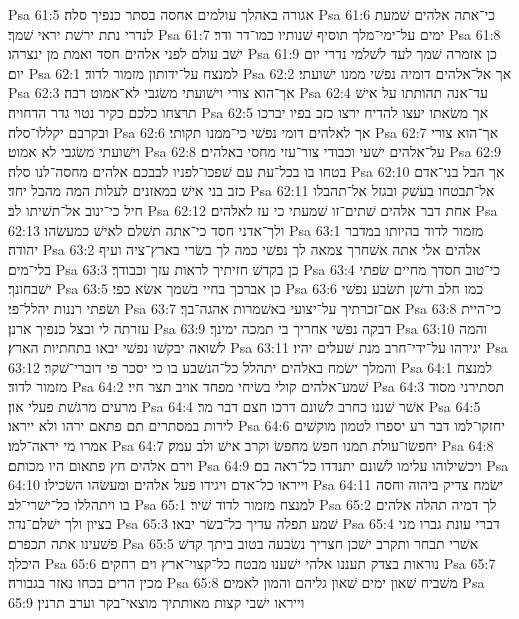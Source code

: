 Psa 61:5  אגורה באהלך עולמים אחסה בסתר כנפיך סלה׃
Psa 61:6  כי־אתה אלהים שׁמעת לנדרי נתת ירשׁת יראי שׁמך׃
Psa 61:7  ימים על־ימי־מלך תוסיף שׁנותיו כמו־דר ודר׃
Psa 61:8  ישׁב עולם לפני אלהים חסד ואמת מן ינצרהו׃
Psa 61:9  כן אזמרה שׁמך לעד לשׁלמי נדרי יום יום׃
Psa 62:1  למנצח על־ידותון מזמור לדוד׃
Psa 62:2  אך אל־אלהים דומיה נפשׁי ממנו ישׁועתי׃
Psa 62:3  אך־הוא צורי וישׁועתי משׂגבי לא־אמוט רבה׃
Psa 62:4  עד־אנה תהותתו על אישׁ תרצחו כלכם כקיר נטוי גדר הדחויה׃
Psa 62:5  אך משׂאתו יעצו להדיח ירצו כזב בפיו יברכו ובקרבם יקללו־סלה׃
Psa 62:6  אך לאלהים דומי נפשׁי כי־ממנו תקותי׃
Psa 62:7  אך־הוא צורי וישׁועתי משׂגבי לא אמוט׃
Psa 62:8  על־אלהים ישׁעי וכבודי צור־עזי מחסי באלהים׃
Psa 62:9  בטחו בו בכל־עת עם שׁפכו־לפניו לבבכם אלהים מחסה־לנו סלה׃
Psa 62:10  אך הבל בני־אדם כזב בני אישׁ במאזנים לעלות המה מהבל יחד׃
Psa 62:11  אל־תבטחו בעשׁק ובגזל אל־תהבלו חיל כי־ינוב אל־תשׁיתו לב׃
Psa 62:12  אחת דבר אלהים שׁתים־זו שׁמעתי כי עז לאלהים׃
Psa 62:13  ולך־אדני חסד כי־אתה תשׁלם לאישׁ כמעשׂהו׃
Psa 63:1  מזמור לדוד בהיותו במדבר יהודה׃
Psa 63:2  אלהים אלי אתה אשׁחרך צמאה לך נפשׁי כמה לך בשׂרי בארץ־ציה ועיף בלי־מים׃
Psa 63:3  כן בקדשׁ חזיתיך לראות עזך וכבודך׃
Psa 63:4  כי־טוב חסדך מחיים שׂפתי ישׁבחונך׃
Psa 63:5  כן אברכך בחיי בשׁמך אשׂא כפי׃
Psa 63:6  כמו חלב ודשׁן תשׂבע נפשׁי ושׂפתי רננות יהלל־פי׃
Psa 63:7  אם־זכרתיך על־יצועי באשׁמרות אהגה־בך׃
Psa 63:8  כי־היית עזרתה לי ובצל כנפיך ארנן׃
Psa 63:9  דבקה נפשׁי אחריך בי תמכה ימינך׃
Psa 63:10  והמה לשׁואה יבקשׁו נפשׁי יבאו בתחתיות הארץ׃
Psa 63:11  יגירהו על־ידי־חרב מנת שׁעלים יהיו׃
Psa 63:12  והמלך ישׂמח באלהים יתהלל כל־הנשׁבע בו כי יסכר פי דוברי־שׁקר׃
Psa 64:1  למנצח מזמור לדוד׃
Psa 64:2  שׁמע־אלהים קולי בשׂיחי מפחד אויב תצר חיי׃
Psa 64:3  תסתירני מסוד מרעים מרגשׁת פעלי און׃
Psa 64:4  אשׁר שׁננו כחרב לשׁונם דרכו חצם דבר מר׃
Psa 64:5  לירות במסתרים תם פתאם ירהו ולא ייראו׃
Psa 64:6  יחזקו־למו דבר רע יספרו לטמון מוקשׁים אמרו מי יראה־למו׃
Psa 64:7  יחפשׂו־עולת תמנו חפשׂ מחפשׂ וקרב אישׁ ולב עמק׃
Psa 64:8  וירם אלהים חץ פתאום היו מכותם׃
Psa 64:9  ויכשׁילוהו עלימו לשׁונם יתנדדו כל־ראה בם׃
Psa 64:10  וייראו כל־אדם ויגידו פעל אלהים ומעשׂהו השׂכילו׃
Psa 64:11  ישׂמח צדיק ביהוה וחסה בו ויתהללו כל־ישׁרי־לב׃
Psa 65:1  למנצח מזמור לדוד שׁיר׃
Psa 65:2  לך דמיה תהלה אלהים בציון ולך ישׁלם־נדר׃
Psa 65:3  שׁמע תפלה עדיך כל־בשׂר יבאו׃
Psa 65:4  דברי עונת גברו מני פשׁעינו אתה תכפרם׃
Psa 65:5  אשׁרי תבחר ותקרב ישׁכן חצריך נשׂבעה בטוב ביתך קדשׁ היכלך׃
Psa 65:6  נוראות בצדק תעננו אלהי ישׁענו מבטח כל־קצוי־ארץ וים רחקים׃
Psa 65:7  מכין הרים בכחו נאזר בגבורה׃
Psa 65:8  משׁביח שׁאון ימים שׁאון גליהם והמון לאמים׃
Psa 65:9  וייראו ישׁבי קצות מאותתיך מוצאי־בקר וערב תרנין׃
